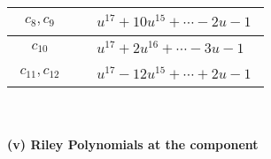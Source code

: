 \documentclass[1p]{elsarticle_modified}
\theoremstyle{definition}
\begin{document}
\begin{tabular}{m{50pt}|m{274pt}}
\hline $$\begin{aligned}c_{8},c_{9}\end{aligned}$$&$\begin{aligned}
&u^{17}+10 u^{15}+\cdots-2 u-1
\end{aligned}$\\
\hline $$\begin{aligned}c_{10}\end{aligned}$$&$\begin{aligned}
&u^{17}+2 u^{16}+\cdots-3 u-1
\end{aligned}$\\
\hline $$\begin{aligned}c_{11},c_{12}\end{aligned}$$&$\begin{aligned}
&u^{17}-12 u^{15}+\cdots+2 u-1
\end{aligned}$\\
\hline
\end{tabular}\\~\\
\newpage\renewcommand{\arraystretch}{1}
\flushleft \textbf{(v) Riley Polynomials at the component}\newline \\
\end{document}
